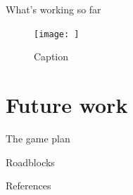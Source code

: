 \documentclass[10pt,xcolor={table,dvipsnames},t]{beamer}
\begin{document}
\begin{frame}{What's working so far}
    \begin{figure}
        \centering
        \texttt{[image: ]}
        \caption{Caption}
        \label{fig:my_label}
    \end{figure}
\end{frame}


\section{Future work}

\begin{frame}{The game plan}

\end{frame}
\begin{frame}{Roadblocks}
    
\end{frame}
\begin{frame}{References}
    \printbibliography{}
\end{frame}
\end{document}
